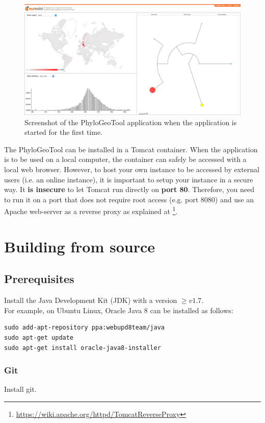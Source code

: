 \documentclass[a4paper, 11pt]{article} %
\begin{document}
\begin{figure}[!htbp]
\includegraphics[scale=0.19]{images/defaultScreenshot.png}
\caption{Screenshot of the PhyloGeoTool application when the application is started for the first time.}
\label{fig:01} 
\end{figure}

The PhyloGeoTool can be installed in a Tomcat container. When the application is to be used on a local computer, the container can safely be accessed with a local web browser. However, to host your own instance to be accessed by external users (i.e. an online instance), it is important to setup your instance in a secure way.
It \textbf{is insecure} to let Tomcat run directly on \textbf{port 80}. Therefore, you need to run it on a port that does not require root access (e.g. port 8080) and use an Apache web-server as a reverse proxy as explained at \footnote{\url{https://wiki.apache.org/httpd/TomcatReverseProxy}}. 

\section{Building from source}
\label{sec:source}

\subsection{Prerequisites}
Install the Java Development Kit (JDK) with a version $\geq v 1.7$.\\

\noindent For example, on Ubuntu Linux, Oracle Java 8 can be installed as follows:
\begin{verbatim} 
sudo add-apt-repository ppa:webupd8team/java
sudo apt-get update
sudo apt-get install oracle-java8-installer
\end{verbatim}

\subsubsection*{Git}
Install git.\\
\end{document}
